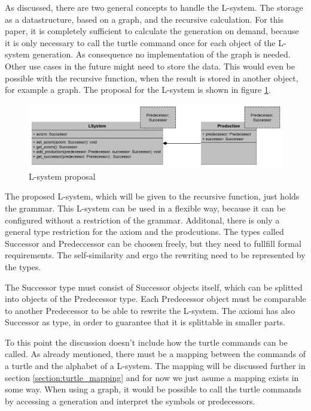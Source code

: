 \documentclass[english]{cpp-hmwk}
\begin{document}
\bigskip
 
\noindent As discussed, there are two general concepts to handle the L-system. The storage as a datastructure, based on a graph, and the recursive calculation. For this paper, it is completely sufficient to calculate the generation on demand, because it is only necessary to call the turtle command once for each object of the L-system generation. As consequence no implementation of the graph is needed. Other use cases in the future might need to store the data. This would even be possible with the recursive function, when the result is stored in another object, for example a graph. The proposal for the L-system is shown in figure \ref{figure:lsystem_proposal}.

\begin{figure}[h!]
	\centering
	\includegraphics[width=1\columnwidth]{../graphs/LSystem/examples/l_system_proposal.png}
	\caption{L-system proposal}
	\label{figure:lsystem_proposal}
\end{figure}

\medskip
\noindent The proposed L-system,  which will be given to the recursive function, just holds the grammar. This L-system can be used in a flexible way, because it can be configured without a restriction of the grammar. Additonal, there is only a general type restriction for the axiom and the prodcutions. The types called Successor and Predeccessor can be choosen freely, but they need to fullfill formal requirements. The self-similarity and ergo the rewriting need to be represented by the types.

The Successor type must consist of Successor objects itself, which can be splitted into objects of the Predecessor type. Each Predecessor object must be comparable to another Predecessor to be able to rewrite the L-system. The axiomi has also Successor as type, in order to guarantee that it is splittable in smaller parts.
 
To this point the discussion doesn't include how the turtle commands can be called. As already mentioned, there must be a mapping between the commands of a turtle and the alphabet of a L-system. The mapping will be discussed further in section \ref{section:turtle_mapping} and for now we just asume a mapping exists in some way. When using a graph, it would be possible to call the turtle commands by accessing a generation and interpret the symbols or predecessors.
\end{document}
